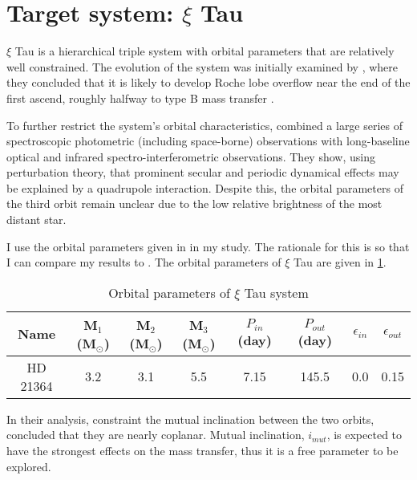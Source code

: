 \section{Target system: $\xi$ Tau}

$\xi$ Tau is a hierarchical triple system with orbital parameters that are relatively well constrained. The evolution of the system was initially examined by \cite{de2014evolution}, where they  concluded that it is likely to develop Roche lobe overflow near the end of the first ascend, roughly halfway to type B mass transfer \citep{kippenhahn1967entwicklung}.

To further restrict the system's orbital characteristics, \cite{nemravova2016xitauri} combined a large series of spectroscopic photometric (including space-borne) observations with long-baseline optical and infrared spectro-interferometric observations. They show, using perturbation theory, that prominent secular and periodic dynamical effects may be explained by a quadrupole interaction. Despite this, the orbital parameters of the third orbit remain unclear due to the low relative brightness of the most distant star.

I use the orbital parameters given in \cite{2010yCat..73890925T} in my study. The rationale for this is so that I can compare my results to \cite{de2014evolution}. The orbital parameters of $\xi$ Tau are given in \cref{tab:system_orbit_param}.
\begin{table}[H]
    \centering
    \begin{tabular}{|c c c c c c c c|}
       Name & M$_1$ (M$_{\odot}$) & M$_2$ (M$_{\odot}$) &
       M$_3$ (M$_{\odot}$) & $P_{in}$ (day) &
       $P_{out}$ (day) & $\epsilon_{in}$ &
       $\epsilon_{out}$ \\
       \hline
       HD 21364 & 3.2 & 3.1 & 5.5 & 7.15 & 145.5 & 0.0 & 0.15
    \end{tabular}
    \caption{ Orbital parameters of $\xi$ Tau system}
    \label{tab:system_orbit_param}
\end{table}
In their analysis, \cite{nemravova2016xitauri} constraint  the mutual inclination between the two orbits, concluded that they are nearly coplanar. Mutual inclination, $i_{mut}$, is expected to have the strongest effects on the mass transfer, thus it is a free parameter to be explored.
